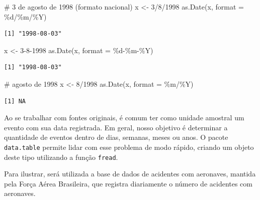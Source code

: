\documentclass[
  letterpaper,
  DIV=11,
  numbers=noendperiod]{scrreprt}
\newenvironment{Shaded}{\begin{snugshade}}{\end{snugshade}}
\newcommand{\AttributeTok}[1]{\textcolor[rgb]{0.40,0.45,0.13}{#1}}
\newcommand{\CommentTok}[1]{\textcolor[rgb]{0.37,0.37,0.37}{#1}}
\newcommand{\FunctionTok}[1]{\textcolor[rgb]{0.28,0.35,0.67}{#1}}
\newcommand{\NormalTok}[1]{\textcolor[rgb]{0.00,0.23,0.31}{#1}}
\newcommand{\OtherTok}[1]{\textcolor[rgb]{0.00,0.23,0.31}{#1}}
\newcommand{\StringTok}[1]{\textcolor[rgb]{0.13,0.47,0.30}{#1}}
\theoremstyle{plain}
\theoremstyle{definition}
\theoremstyle{definition}
\theoremstyle{remark}
\begin{document}
\begin{Shaded}
\begin{Highlighting}[]
\CommentTok{\# 3 de agosto de 1998 (formato nacional)}
\NormalTok{x }\OtherTok{\textless{}{-}} \StringTok{\textquotesingle{}3/8/1998\textquotesingle{}}
\FunctionTok{as.Date}\NormalTok{(x, }\AttributeTok{format =} \StringTok{\textquotesingle{}\%d/\%m/\%Y\textquotesingle{}}\NormalTok{)}
\end{Highlighting}
\end{Shaded}

\begin{verbatim}
[1] "1998-08-03"
\end{verbatim}

\begin{Shaded}
\begin{Highlighting}[]
\NormalTok{x }\OtherTok{\textless{}{-}} \StringTok{\textquotesingle{}3{-}8{-}1998\textquotesingle{}}
\FunctionTok{as.Date}\NormalTok{(x, }\AttributeTok{format =} \StringTok{\textquotesingle{}\%d{-}\%m{-}\%Y\textquotesingle{}}\NormalTok{)}
\end{Highlighting}
\end{Shaded}

\begin{verbatim}
[1] "1998-08-03"
\end{verbatim}

\begin{Shaded}
\begin{Highlighting}[]
\CommentTok{\# agosto de 1998}
\NormalTok{x }\OtherTok{\textless{}{-}} \StringTok{\textquotesingle{}8/1998\textquotesingle{}}
\FunctionTok{as.Date}\NormalTok{(x, }\AttributeTok{format =} \StringTok{\textquotesingle{}\%m/\%Y\textquotesingle{}}\NormalTok{)}
\end{Highlighting}
\end{Shaded}

\begin{verbatim}
[1] NA
\end{verbatim}

Ao se trabalhar com fontes originais, é comum ter como unidade amostral
um evento com sua data registrada. Em geral, nosso objetivo é determinar
a quantidade de eventos dentro de dias, semanas, meses ou anos. O pacote
\texttt{data.table} permite lidar com esse problema de modo rápido,
criando um objeto deste tipo utilizando a função \texttt{fread}.

Para ilustrar, será utilizada a base de dados de acidentes com
aeronaves, mantida pela Força Aérea Brasileira, que registra diariamente
o número de acidentes com aeronaves.
\end{document}
